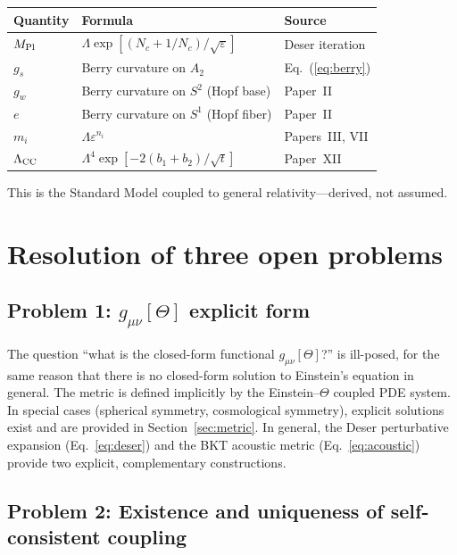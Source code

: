 \documentclass[twocolumn,preprintnumbers,amsmath,amssymb,prd]{revtex4-2}
\begin{document}
\begin{center}
\begin{tabular}{lll}
\toprule
Quantity & Formula & Source \\
\midrule
$M_{\rm Pl}$ & $\Lambda\exp[(N_c+1/N_c)/\sqrt{\varepsilon}]$ & Deser iteration \\
$g_s$ & Berry curvature on $A_2$ & Eq.~(\ref{eq:berry}) \\
$g_w$ & Berry curvature on $S^2$ (Hopf base) & Paper~II \\
$e$ & Berry curvature on $S^1$ (Hopf fiber) & Paper~II \\
$m_i$ & $\Lambda\varepsilon^{n_i}$ & Papers~III, VII \\
$\Lambda_{\rm CC}$ & $\Lambda^4\exp[-2(b_1+b_2)/\sqrt{t}]$ & Paper~XII \\
\bottomrule
\end{tabular}
\end{center}

\noindent
This is the Standard Model coupled to general relativity---derived, not assumed.

\section{Resolution of three open problems}
\label{sec:open}

\subsection{Problem 1: $g_{\mu\nu}[\Theta]$ explicit form}

The question ``what is the closed-form functional $g_{\mu\nu}[\Theta]$?'' is ill-posed, for the same reason that there is no closed-form solution to Einstein's equation in general.
The metric is defined implicitly by the Einstein--$\Theta$ coupled PDE system.
In special cases (spherical symmetry, cosmological symmetry), explicit solutions exist and are provided in Section~\ref{sec:metric}.
In general, the Deser perturbative expansion (Eq.~\ref{eq:deser}) and the BKT acoustic metric (Eq.~\ref{eq:acoustic}) provide two explicit, complementary constructions.

\subsection{Problem 2: Existence and uniqueness of self-consistent coupling}
\end{document}
